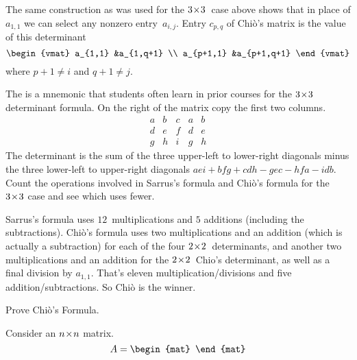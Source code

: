 \begin{exercises}
    \begin{answer}
      The same construction as was used for the $3 \! \times \! 3$~case above shows
      that in place of $a_{1,1}$ we can select any nonzero entry~$a_{i,j}$.
      Entry $c_{p,q}$ of Chi\`o's matrix is the value of this determinant
      \begin{equation*}
        \begin{vmat}
          a_{1,1}    &a_{1,q+1} \\
          a_{p+1,1}  &a_{p+1,q+1}
        \end{vmat}
      \end{equation*}
      where $p+1\neq i$ and $q+1\neq j$.
    \end{answer}
  \item The 
    is a mnemonic that students often learn in prior courses 
    for the $3 \! \times \! 3$ determinant formula.
    On the right of the matrix copy the first two columns. 
    \begin{equation*}
      \begin{array}{ccc|cc}
        a &b &c &a &b \\
        d &e &f &d &e \\
        g &h &i &g &h
      \end{array}
    \end{equation*}
    The determinant is the sum of the
    three upper-left to lower-right diagonals minus the
    three lower-left to upper-right diagonals
    $aei+bfg+cdh-gec-hfa-idb$.
   Count the operations involved in Sarrus's formula and 
   Chi\`o's formula for the $3 \! \times \! 3$ case and see which uses fewer.
   \begin{answer}
     Sarrus's formula uses $12$~multiplications and $5$ additions (including
     the subtractions).
     Chi\`o's formula uses two multiplications and an addition
     (which is actually a subtraction)
     for each of the four $2 \! \times \! 2$~determinants, and another two
     multiplications and an addition for the $2 \! \times \! 2$~Chio's determinant, as
     well as a final division by $a_{1,1}$.
     That's eleven multiplication/divisions and five addition/subtractions.
     So Chi\`o is the winner.
   \end{answer}
  \item Prove Chi\`o's Formula.
    \begin{answer}
      Consider an $n \! \times \! n$ matrix.
      \begin{equation*}
        A=
        \begin{mat}

\end{mat}
\end{equation*}
\end{answer}
\end{exercises}
